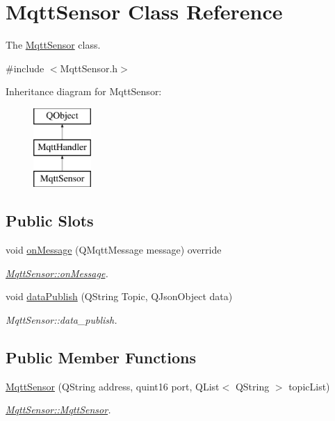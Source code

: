 \hypertarget{classMqttSensor}{}\section{Mqtt\+Sensor Class Reference}
\label{classMqttSensor}


The \hyperlink{classMqttSensor}{Mqtt\+Sensor} class.  




{\ttfamily \#include $<$Mqtt\+Sensor.\+h$>$}

Inheritance diagram for Mqtt\+Sensor\+:\begin{figure}[H]
\begin{center}
\leavevmode
\includegraphics[height=3.000000cm]{classMqttSensor}
\end{center}
\end{figure}
\subsection*{Public Slots}
\begin{DoxyCompactItemize}
\item 
void \hyperlink{classMqttSensor_a5ced2fd35046b8306902358860cb3dce}{on\+Message} (Q\+Mqtt\+Message message) override
\begin{DoxyCompactList}\small\item\em \hyperlink{classMqttSensor_a5ced2fd35046b8306902358860cb3dce}{Mqtt\+Sensor\+::on\+Message}. \end{DoxyCompactList}\item 
void \hyperlink{classMqttSensor_a0e7aa8d83910d9481683b34bf3075321}{data\+Publish} (Q\+String Topic, Q\+Json\+Object data)
\begin{DoxyCompactList}\small\item\em Mqtt\+Sensor\+::data\+\_\+publish. \end{DoxyCompactList}\end{DoxyCompactItemize}
\subsection*{Public Member Functions}
\begin{DoxyCompactItemize}
\item 
\hyperlink{classMqttSensor_a2b6e93a22be073904ade69ce1af4e03f}{Mqtt\+Sensor} (Q\+String address, quint16 port, Q\+List$<$ Q\+String $>$ topic\+List)
\begin{DoxyCompactList}\small\item\em \hyperlink{classMqttSensor_a2b6e93a22be073904ade69ce1af4e03f}{Mqtt\+Sensor\+::\+Mqtt\+Sensor}. \end{DoxyCompactList}\end{DoxyCompactItemize}
